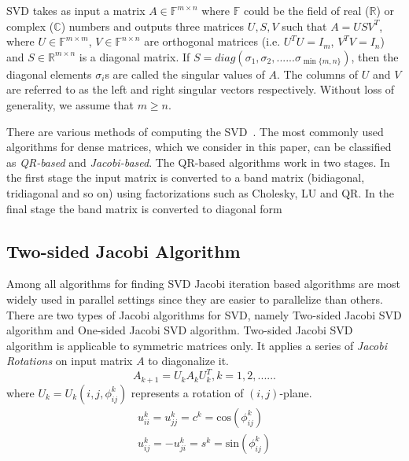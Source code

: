 \documentclass[10pt, conference, compsocconf]{IEEEtran}
\begin{document}
SVD takes as input a matrix $A \in \mathbb{F}^{m \times n}$ where $\mathbb{F}$ could be the field of real ($\mathbb{R}$) or complex ($\mathbb{C}$) numbers and outputs three matrices $U, S, V$ such that $A = USV^T$, where $U \in \mathbb{F}^{m \times m}$, $V \in \mathbb{F}^{n \times n}$ are orthogonal matrices (i.e. $U^TU = I_m$, $V^TV = I_n$) and $S \in \mathbb{R}^{m \times n}$ is a diagonal matrix. If $S = diag(\sigma_1, \sigma_2,......\sigma_{\min\{m,n\}})$, then the diagonal elements $\sigma_i$s are called the singular values of $A$. The columns of $U$ and $V$ are referred to as the left and right singular vectors respectively. Without loss of generality, we assume that $m \ge n$. 

There are various methods of computing the SVD~\cite{golub2012matrix}. The most commonly used algorithms for dense matrices, which we consider in this paper, can be classified as \emph{QR-based} and \emph{Jacobi-based}. The QR-based algorithms work in two stages. In the first stage the input matrix is converted to a band matrix (bidiagonal, tridiagonal and so on) using factorizations such as Cholesky, LU and QR. In the final stage the band matrix is converted to diagonal form 


\subsection{Two-sided Jacobi Algorithm}

\par Among all algorithms for finding SVD Jacobi iteration based algorithms are most widely used in parallel settings since they are easier to parallelize than others. There are two types of Jacobi algorithms for SVD, namely Two-sided Jacobi SVD algorithm and One-sided Jacobi SVD algorithm. Two-sided Jacobi SVD algorithm is applicable to symmetric matrices only. It applies a series of \textit{Jacobi Rotations} on input matrix $A$ to diagonalize it. 
\[
A_{k+1} = U_kA_kU_k^T, k =1,2,......
\]   
where $U_k = U_k(i,j,\phi^k_{ij})$ represents a rotation of $(i,j)$-plane. 
\begin{gather}
u_{ii}^k = u_{jj}^k = c^k = \text{cos}(\phi^k_{ij}) \\
u_{ij}^k = -u_{ji}^k = s^k = \text{sin}(\phi^k_{ij}) 
\end{gather}
\end{document}

